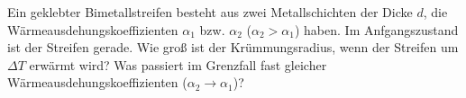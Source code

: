 \begin{Exercise}[difficulty = 3, origin = 3. Runde IPhO-Auswahlwettbewerb 2008, title = Bimetallstreifen, label = bms ]
	\hspace{4pt}
	Ein geklebter Bimetallstreifen besteht aus zwei Metallschichten der Dicke $d$, die  Wärmeausdehungskoeffizienten $\alpha_1$ bzw. $\alpha_2$ ($\alpha_2>\alpha_1$) haben. Im Anfgangszustand ist der Streifen gerade. 
	Wie groß ist der Krümmungsradius, wenn der Streifen um $\Delta T$ erwärmt wird? Was passiert im Grenzfall fast gleicher Wärmeausdehungskoeffizienten ($\alpha_2\rightarrow\alpha_1$)?
\end{Exercise}
